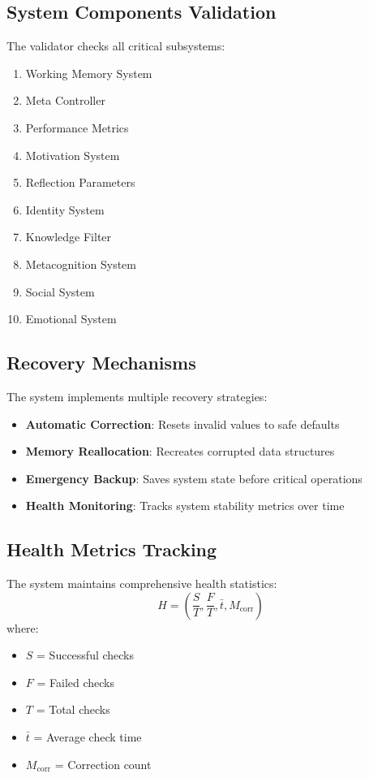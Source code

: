 \documentclass{article}
\begin{document}
\subsection{System Components Validation}
The validator checks all critical subsystems:
\begin{enumerate}[leftmargin=*]
\item Working Memory System
\item Meta Controller
\item Performance Metrics
\item Motivation System
\item Reflection Parameters
\item Identity System
\item Knowledge Filter
\item Metacognition System
\item Social System
\item Emotional System
\end{enumerate}

\subsection{Recovery Mechanisms}
The system implements multiple recovery strategies:
\begin{itemize}[leftmargin=*]
\item \textbf{Automatic Correction}: Resets invalid values to safe defaults
\item \textbf{Memory Reallocation}: Recreates corrupted data structures
\item \textbf{Emergency Backup}: Saves system state before critical operations
\item \textbf{Health Monitoring}: Tracks system stability metrics over time
\end{itemize}

\subsection{Health Metrics Tracking}
The system maintains comprehensive health statistics:
\begin{equation}
H = \left(\frac{S}{T}, \frac{F}{T}, \bar{t}, M_{\text{corr}}\right)
\end{equation}
where:
\begin{itemize}[leftmargin=*]
\item $S$ = Successful checks
\item $F$ = Failed checks
\item $T$ = Total checks
\item $\bar{t}$ = Average check time
\item $M_{\text{corr}}$ = Correction count
\end{itemize}
\end{document}

